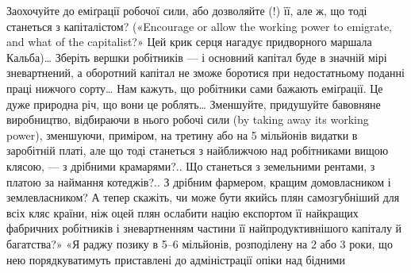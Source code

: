 Заохочуйте до еміґрації робочої сили, або дозволяйте (!)
її, але ж, що тоді станеться з капіталістом? («Encourage
or allow the working power to emigrate, and what of the capitalist?»
Цей крик серця нагадує придворного маршала Кальба)\dots{}
Зберіть вершки робітників — і основний капітал буде в значній
мірі зневартнений, а оборотний капітал не зможе боротися при
недостатньому поданні праці нижчого сорту\dots{} Нам кажуть,
що робітники сами бажають еміґрації. Це дуже природна річ,
що вони це роблять\dots{} Зменшуйте, придушуйте бавовняне виробництво,
відбираючи в нього робочі сили (by taking away its working
power), зменшуючи, приміром, на третину або на 5 мільйонів
видатки в заробітній платі, але що тоді станеться з найближчою
над робітниками вищою клясою, — з дрібними крамарями?..
Що станеться з земельними рентами, з платою за наймання котеджів?..
З дрібним фармером, кращим домовласником і землевласником?
А тепер скажіть, чи може бути якийсь плян самозгубніший
для всіх кляс країни, ніж оцей плян ослабити націю
експортом її найкращих фабричних робітників і зневартненням
частини її найпродуктивнішого капіталу й багатства?» «Я раджу
позику в 5--6 мільйонів, розподілену на 2 або 3 роки, що нею
порядкуватимуть приставлені до адміністрації опіки над бідними
\parbreak{}  %
